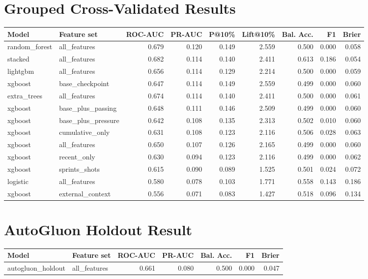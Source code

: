 \documentclass[11pt]{article}
\begin{document}
\section{Grouped Cross-Validated Results}
\begin{longtable}{llrrrrrrr}
\toprule
Model & Feature set & ROC-AUC & PR-AUC & P@10\% & Lift@10\% & Bal. Acc. & F1 & Brier \\
\midrule
random\_forest & all\_features & 0.679 & 0.120 & 0.149 & 2.559 & 0.500 & 0.000 & 0.058 \\
stacked & all\_features & 0.682 & 0.114 & 0.140 & 2.411 & 0.613 & 0.186 & 0.054 \\
lightgbm & all\_features & 0.656 & 0.114 & 0.129 & 2.214 & 0.500 & 0.000 & 0.059 \\
xgboost & base\_checkpoint & 0.647 & 0.114 & 0.149 & 2.559 & 0.499 & 0.000 & 0.060 \\
extra\_trees & all\_features & 0.674 & 0.114 & 0.140 & 2.411 & 0.500 & 0.000 & 0.061 \\
xgboost & base\_plus\_passing & 0.648 & 0.111 & 0.146 & 2.509 & 0.499 & 0.000 & 0.060 \\
xgboost & base\_plus\_pressure & 0.642 & 0.108 & 0.135 & 2.313 & 0.502 & 0.010 & 0.060 \\
xgboost & cumulative\_only & 0.631 & 0.108 & 0.123 & 2.116 & 0.506 & 0.028 & 0.063 \\
xgboost & all\_features & 0.650 & 0.107 & 0.126 & 2.165 & 0.499 & 0.000 & 0.060 \\
xgboost & recent\_only & 0.630 & 0.094 & 0.123 & 2.116 & 0.499 & 0.000 & 0.062 \\
xgboost & sprints\_shots & 0.615 & 0.090 & 0.089 & 1.525 & 0.501 & 0.024 & 0.072 \\
logistic & all\_features & 0.580 & 0.078 & 0.103 & 1.771 & 0.558 & 0.143 & 0.186 \\
xgboost & external\_context & 0.556 & 0.071 & 0.083 & 1.427 & 0.518 & 0.096 & 0.134 \\
\bottomrule
\end{longtable}

\section{AutoGluon Holdout Result}
\begin{longtable}{llrrrrr}
\toprule
Model & Feature set & ROC-AUC & PR-AUC & Bal. Acc. & F1 & Brier \\
\midrule
autogluon\_holdout & all\_features & 0.661 & 0.080 & 0.500 & 0.000 & 0.047 \\
\bottomrule
\end{longtable}
\end{document}
